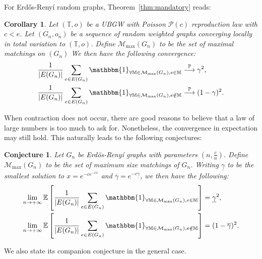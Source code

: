 \documentclass[11pt]{article}
\newtheorem{coro}{Corollary}[section]
\newtheorem{conj}{Conjecture}
\begin{document}
For Erd\H{o}s-Renyí random graphs, Theorem~\ref{thm:mandatory} reads:
\begin{coro}
    Let $(\mathbb{T},o)$ be a UBGW with Poisson $\mathcal{P}(c)$ reproduction law with $c<e$.
    Let $(G_n,o_n)$ be a sequence of random weighted graphs converging locally in total variation to $(\mathbb{T},o)$. Define $\mathcal{M}_{\max}(G_n)$ to be the set of maximal matchings on $(G_n)$
    We then have the following convergence:
        \begin{equation}
            \begin{aligned}
                \frac{1}{|E(G_n)|} \sum_{e \in E(G_n)} \mathbbm{1}_{\forall \mathbb{M} \in \mathcal{M}_{\max}(G_n), e \in \mathbb{M}} &\overset{\mathbb{P}}{\longrightarrow} \gamma^2, \\
                 \frac{1}{|E(G_n)|} \sum_{e \in E(G_n)} \mathbbm{1}_{\forall \mathbb{M} \in \mathcal{M}_{\max}(G_n), e \notin \mathbb{M}} &\overset{\mathbb{P}}{\longrightarrow} (1-\gamma)^2.
            \end{aligned}
        \end{equation}
\end{coro}
When contraction does not occur, there are good reasons to believe that a law of large numbers is too much to ask for. Nonetheless, the convergence in expectation may still hold. This naturally leads to the following conjectures:
\begin{conj}\label{conj:ER}
    Let $G_n$ be Erdös-Reny\'i graphs with parameters $(n, \frac{c}{n})$.
    Define $\mathcal{M}_{\max}(G_n)$ to be the set of maximum size matchings of $G_n$. Writing $\underline{\gamma}$ to be the smallest solution to $x=e^{-ce^{-cx}}$ and $\overline{\gamma}=e^{-c\underline{\gamma}}$, we then have the following:
        \begin{equation}
            \begin{aligned}
                \lim_{n \rightarrow +\infty} \mathbb{E}\left[ \frac{1}{|E(G_n)|} \sum_{e \in E(G_n)} \mathbbm{1}_{\forall \mathbb{M} \in \mathcal{M}_{\max}(G_n), e \in \mathbb{M}}\right] &= \underline{\gamma}^2, \\
                \lim_{n \rightarrow +\infty} \mathbb{E}\left[ \frac{1}{|E(G_n)|} \sum_{e \in E(G_n)} \mathbbm{1}_{\forall \mathbb{M} \in \mathcal{M}_{\max}(G_n), e \notin \mathbb{M}}\right] &= (1-\overline{\gamma})^2.
            \end{aligned}
        \end{equation}
\end{conj}
We also state its companion conjecture in the general case.
\end{document}
